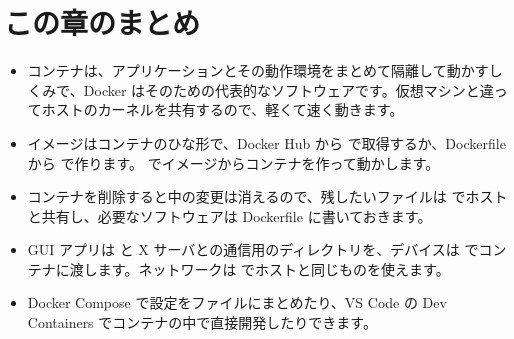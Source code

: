 \section*{この章のまとめ}

\begin{itemize}
  \item コンテナは、アプリケーションとその動作環境をまとめて隔離して動かすしくみで、Docker はそのための代表的なソフトウェアです。仮想マシンと違ってホストのカーネルを共有するので、軽くて速く動きます。
  \item イメージはコンテナのひな形で、Docker Hub から  で取得するか、Dockerfile から  で作ります。 でイメージからコンテナを作って動かします。
  \item コンテナを削除すると中の変更は消えるので、残したいファイルは  でホストと共有し、必要なソフトウェアは Dockerfile に書いておきます。
  \item GUI アプリは  と X サーバとの通信用のディレクトリを、デバイスは  でコンテナに渡します。ネットワークは  でホストと同じものを使えます。
  \item Docker Compose で設定をファイルにまとめたり、VS Code の Dev Containers でコンテナの中で直接開発したりできます。
\end{itemize}
